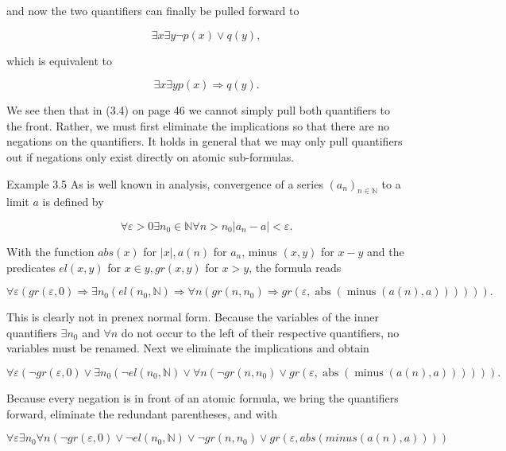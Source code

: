 \documentclass[10pt]{article}
\begin{document}
and now the two quantifiers can finally be pulled forward to

$$
\exists x \exists y \neg p(x) \vee q(y),
$$

which is equivalent to

$$
\exists x \exists y p(x) \Rightarrow q(y) .
$$

We see then that in (3.4) on page 46 we cannot simply pull both quantifiers to the front. Rather, we must first eliminate the implications so that there are no negations on the quantifiers. It holds in general that we may only pull quantifiers out if negations only exist directly on atomic sub-formulas.

Example 3.5 As is well known in analysis, convergence of a series $\left(a_{n}\right)_{n \in \mathbb{N}}$ to a limit $a$ is defined by

$$
\forall \varepsilon>0 \exists n_{0} \in \mathbb{N} \forall n>n_{0}\left|a_{n}-a\right|<\varepsilon .
$$

With the function $a b s(x)$ for $|x|, a(n)$ for $a_{n}$, minus $(x, y)$ for $x-y$ and the predicates $e l(x, y)$ for $x \in y, g r(x, y)$ for $x>y$, the formula reads


\begin{equation*}
\forall \varepsilon\left(g r(\varepsilon, 0) \Rightarrow \exists n_{0}\left(e l\left(n_{0}, \mathbb{N}\right) \Rightarrow \forall n\left(g r\left(n, n_{0}\right) \Rightarrow g r(\varepsilon, \operatorname{abs}(\operatorname{minus}(a(n), a)))\right)\right)\right) . \tag{3.5}
\end{equation*}


This is clearly not in prenex normal form. Because the variables of the inner quantifiers $\exists n_{0}$ and $\forall n$ do not occur to the left of their respective quantifiers, no variables must be renamed. Next we eliminate the implications and obtain

$$
\forall \varepsilon\left(\neg g r(\varepsilon, 0) \vee \exists n_{0}\left(\neg e l\left(n_{0}, \mathbb{N}\right) \vee \forall n\left(\neg g r\left(n, n_{0}\right) \vee g r(\varepsilon, \operatorname{abs}(\operatorname{minus}(a(n), a)))\right)\right)\right) .
$$

Because every negation is in front of an atomic formula, we bring the quantifiers forward, eliminate the redundant parentheses, and with

$$
\forall \varepsilon \exists n_{0} \forall n\left(\neg g r(\varepsilon, 0) \vee \neg e l\left(n_{0}, \mathbb{N}\right) \vee \neg g r\left(n, n_{0}\right) \vee g r(\varepsilon, a b s(m i n u s(a(n), a)))\right)
$$
\end{document}
